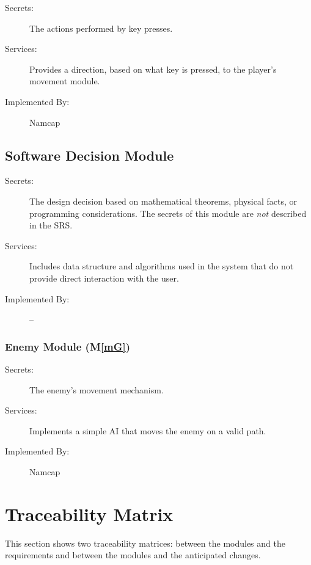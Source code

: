 \documentclass[12pt, titlepage]{article}
\newcommand{\mref}[1]{M\ref{#1}}
\begin{document}
\begin{description}
\item[Secrets:]The actions performed by key presses.
\item[Services:]Provides a direction, based on what key is pressed, to the player's movement module.
\item[Implemented By:] Namcap
\end{description}


\subsection{Software Decision Module}
\begin{description}
\item[Secrets:] The design decision based on mathematical theorems, physical
  facts, or programming considerations. The secrets of this module are
  \emph{not} described in the SRS.
\item[Services:] Includes data structure and algorithms used in the system that
  do not provide direct interaction with the user. 
\item[Implemented By:] --
\end{description}
\subsubsection{Enemy Module (\mref{mG})}

\begin{description}
\item[Secrets:]The enemy's movement mechanism.
\item[Services:]Implements a simple AI that moves the enemy on a valid path.
\item[Implemented By:] Namcap
\end{description}


\section{Traceability Matrix} \label{SecTM}

This section shows two traceability matrices: between the modules and the
requirements and between the modules and the anticipated changes.
\end{document}
